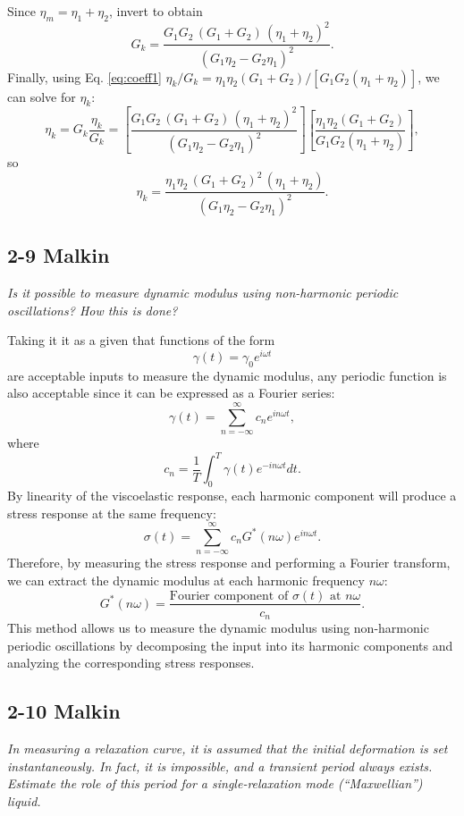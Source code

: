 Since $\eta_m=\eta_1+\eta_2$, invert to obtain
\begin{equation*}
	\boxed{
	G_k=
	\frac{G_1G_2\,(G_1+G_2)\,(\eta_1+\eta_2)^2}{(G_1\eta_2-G_2\eta_1)^2}
	}.
\end{equation*}
Finally, using Eq. \ref{eq:coeff1} $\eta_k/G_k=\eta_1\eta_2(G_1+G_2)/[G_1G_2(\eta_1+\eta_2)]$, we can solve for $\eta_k$:
\begin{equation*}
	\eta_k
	=
	G_k\frac{\eta_k}{G_k}
	=
	\left[\frac{G_1G_2\,(G_1+G_2)\,(\eta_1+\eta_2)^2}{(G_1\eta_2-G_2\eta_1)^2}\right]
	\left[\frac{\eta_1\eta_2(G_1+G_2)}{G_1G_2(\eta_1+\eta_2)}\right],
\end{equation*}
so
\begin{equation*}
	\boxed{
	\eta_k=
	\frac{\eta_1\eta_2\,(G_1+G_2)^2\,(\eta_1+\eta_2)}{(G_1\eta_2-G_2\eta_1)^2}
	}.
\end{equation*}

\subsection{2-9 Malkin}
\textit{Is it possible to measure dynamic modulus using non-harmonic periodic oscillations? How this is done?}

Taking it it as a given that functions of the form 
\[
	\gamma(t) = \gamma_0 e^{i\omega t}
\]
are acceptable inputs to measure the dynamic modulus, any periodic function is also acceptable since it can be expressed as a Fourier series:
\[
	\gamma(t) = \sum_{n=-\infty}^\infty c_n e^{i n \omega t},
\]
where
\[	c_n = \frac{1}{T} \int_0^T \gamma(t) e^{-i n \omega t} dt. \]
By linearity of the viscoelastic response, each harmonic component will produce a stress response at the same frequency:
\[	\sigma(t) = \sum_{n=-\infty}^\infty c_n G^*(n\omega) e^{i n \omega t}. \]
Therefore, by measuring the stress response and performing a Fourier transform, we can extract the dynamic modulus at each harmonic frequency $n\omega$:
\[	G^*(n\omega) = \frac{\text{Fourier component of } \sigma(t) \text{ at } n\omega}{c_n}. \]
This method allows us to measure the dynamic modulus using non-harmonic periodic oscillations by decomposing the input into its harmonic components and analyzing the corresponding stress responses.

\subsection{2-10 Malkin}
\textit{In measuring a relaxation curve, it is assumed that the initial deformation is set instantaneously. In fact, it is impossible, and a transient period always exists. Estimate the role of this period for a single-relaxation mode (``Maxwellian'') liquid.}

